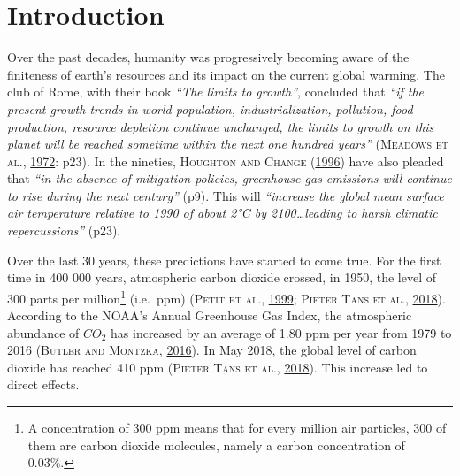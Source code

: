 \documentclass[12pt,]{article}
\let\rmarkdownfootnote\footnote%
\def\footnote{\protect\rmarkdownfootnote}
\begin{document}
\newpage


\pagestyle{fancy} \renewcommand{\headrulewidth}{0.4pt}
\renewcommand{\footrulewidth}{0pt} 

\section*{Introduction}\label{introduction}

Over the past decades, humanity was progressively becoming aware of the
finiteness of earth's resources and its impact on the current global
warming. The club of Rome, with their book \emph{``The limits to
growth''}, concluded that \emph{``if the present growth trends in world
population, industrialization, pollution, food production, resource
depletion continue unchanged, the limits to growth on this planet will
be reached sometime within the next one hundred years''}
(\textsc{Meadows et al.}, \protect\hyperlink{ref-Meadows1972}{1972}:
p23). In the nineties, \textsc{Houghton and Change}
(\protect\hyperlink{ref-HoughtonClimateChange19951996}{1996}) have also
pleaded that \emph{``in the absence of mitigation policies, greenhouse
gas emissions will continue to rise during the next century''} (p9).
This will \emph{``increase the global mean surface air temperature
relative to 1990 of about 2°C by 2100\ldots{}leading to harsh climatic
repercussions''} (p23).

Over the last 30 years, these predictions have started to come true. For
the first time in 400 000 years, atmospheric carbon dioxide crossed, in
1950, the level of 300 parts per
million\footnote{A concentration of 300 ppm means that for every million air particles, 300 of them are carbon dioxide molecules, namely a carbon concentration of 0.03\%.}
(i.e.~ppm) (\textsc{Petit et al.},
\protect\hyperlink{ref-Petit1999}{1999}; \textsc{Pieter Tans et al.},
\protect\hyperlink{ref-PieterTans2018}{2018}). According to the NOAA's
Annual Greenhouse Gas Index, the atmospheric abundance of \(CO_{2}\) has
increased by an average of 1.80 ppm per year from 1979 to 2016
(\textsc{Butler and Montzka}, \protect\hyperlink{ref-Butler2016}{2016}).
In May 2018, the global level of carbon dioxide has reached 410 ppm
(\textsc{Pieter Tans et al.},
\protect\hyperlink{ref-PieterTans2018}{2018}). This increase led to
direct effects.
\end{document}
